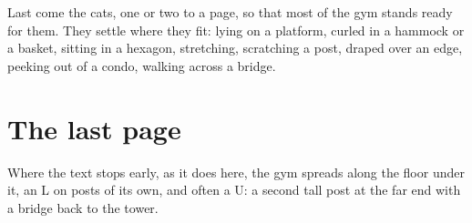 \documentclass[11pt,a4paper]{article}
\begin{document}
Last come the cats, one or two to a page, so that most of the gym stands ready for them.
They settle where they fit: lying on a platform, curled in a hammock or a basket, sitting in a
hexagon, stretching, scratching a post, draped over an edge, peeking out of a condo, walking
across a bridge.

\section{The last page}

Where the text stops early, as it does here, the gym spreads along the floor under it, an
L on posts of its own, and often a U: a second tall post at the far end with a bridge back
to the tower.
\florilegiumtextend
\end{document}
